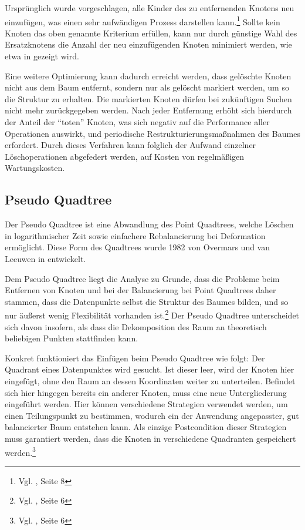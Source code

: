 \documentclass[%
			paper=a4,%
			DIV12,
			liststotoc,
			bibtotoc,
			draft=false,%
			titlepage,
			numbers=noendperiod
			]{scrartcl}
\newcommand{\zit}[3]{#1 \cite{#2}, #3}
\newcommand{\footzit}[3]{\footnote{\zit{#1}{#2}{#3}}}
\begin{document}
Ursprünglich wurde vorgeschlagen, alle Kinder des zu entfernenden Knotens neu einzufügen, was einen sehr aufwändigen Prozess darstellen kann.\footzit{Vgl.}{DBLP:journals/acta/FinkelB74}{Seite 8}
Sollte kein Knoten das oben genannte Kriterium erfüllen, kann nur durch günstige Wahl des Ersatzknotens die Anzahl der neu einzufügenden Knoten minimiert werden, wie etwa in \cite{DBLP:journals/cacm/Samet80a} gezeigt wird.

Eine weitere Optimierung kann dadurch erreicht werden, dass gelöschte Knoten nicht aus dem Baum entfernt, sondern nur als gelöscht markiert werden, um so die Struktur zu erhalten.
Die markierten Knoten dürfen bei zukünftigen Suchen nicht mehr zurückgegeben werden.
Nach jeder Entfernung erhöht sich hierdurch der Anteil der "`toten"' Knoten, was sich negativ auf die Performance aller Operationen auswirkt, und periodische Restrukturierungsmaßnahmen des Baumes erfordert.
Durch dieses Verfahren kann folglich der Aufwand einzelner Löschoperationen abgefedert werden, auf Kosten von regelmäßigen Wartungskosten.

\subsection{Pseudo Quadtree}
\label{sec:pseudoquadtree}
Der Pseudo Quadtree ist eine Abwandlung des Point Quadtrees, welche Löschen in logarithmischer Zeit sowie einfachere Rebalancierung bei Deformation ermöglicht. Diese Form des Quadtrees wurde 1982 von Overmars und van Leeuwen in \cite{DBLP:journals/acta/OvermarsL82} entwickelt.

Dem Pseudo Quadtree liegt die Analyse zu Grunde, dass die Probleme beim Entfernen von Knoten und bei der Balancierung bei Point Quadtrees daher stammen, dass die Datenpunkte selbst die Struktur des Baumes bilden, und so nur äußerst wenig Flexibilität vorhanden ist.\footzit{Vgl.}{DBLP:journals/acta/OvermarsL82}{Seite 6}
Der Pseudo Quadtree unterscheidet sich davon insofern, als dass die Dekomposition des Raum an theoretisch beliebigen Punkten stattfinden kann. 

Konkret funktioniert das Einfügen beim Pseudo Quadtree wie folgt:
Der Quadrant eines Datenpunktes wird gesucht.
Ist dieser leer, wird der Knoten hier eingefügt, ohne den Raum an dessen Koordinaten weiter zu unterteilen.
Befindet sich hier hingegen bereits ein anderer Knoten, muss eine neue Untergliederung eingeführt werden.
Hier können verschiedene Strategien verwendet werden, um einen Teilungspunkt zu bestimmen, wodurch ein der Anwendung angepasster, gut balancierter Baum entstehen kann.
Als einzige Postcondition dieser Strategien muss garantiert werden,
dass die Knoten in verschiedene Quadranten gespeichert werden.\footzit{Vgl.}{DBLP:journals/acta/OvermarsL82}{Seite 6}
\end{document}
